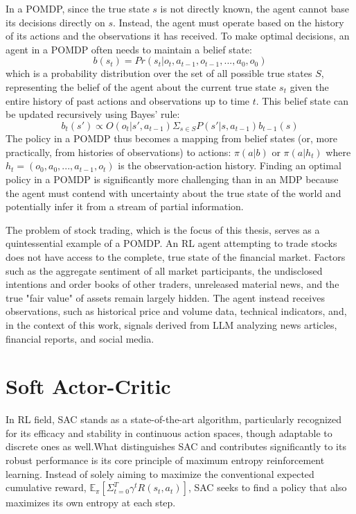 In a \gls{POMDP}, since the true state \(s\) is not directly known, the agent cannot base its decisions directly on \(s\). Instead, the agent must operate based on the history of its actions and the observations it has received. To make optimal decisions, an agent in a POMDP often needs to maintain a belief state: 
\[b(s_t) = Pr(s_t | o_t, a_{t-1}, o_{t-1}, ..., a_0, o_0)\] 
which is a probability distribution over the set of all possible true states \(S\), representing the belief of the agent about the current true state \(s_t\) given the entire history of past actions and observations up to time \(t\). This belief state can be updated recursively using Bayes' rule: 
\[b_t(s') \propto  O(o_t | s', a_{t-1}) \Sigma_{s \in S} P(s' | s, a_{t-1}) b_{t-1}(s)\] 
The policy in a \gls{POMDP} thus becomes a mapping from belief states (or, more practically, from histories of observations) to actions: \(\pi(a | b)\) or \(\pi(a | h_t)\) where \(h_t = (o_0, a_0, ..., a_{t-1}, o_t)\) is the observation-action history. Finding an optimal policy in a \gls{POMDP} is significantly more challenging than in an \gls{MDP} because the agent must contend with uncertainty about the true state of the world and potentially infer it from a stream of partial information.

The problem of stock trading, which is the focus of this thesis, serves as a quintessential example of a \gls{POMDP}. An \gls{RL} agent attempting to trade stocks does not have access to the complete, true state of the financial market. Factors such as the aggregate sentiment of all market participants, the undisclosed intentions and order books of other traders, unreleased material news, and the true "fair value" of assets remain largely hidden. The agent instead receives observations, such as historical price and volume data, technical indicators, and, in the context of this work, signals derived from \gls{LLM} analyzing news articles, financial reports, and social media. 

\section{Soft Actor-Critic}
\label{sec:sac}
In \gls{RL} field, \gls{SAC} stands as a state-of-the-art algorithm, particularly recognized for its efficacy and stability in continuous action spaces, though adaptable to discrete ones as well.What distinguishes \gls{SAC} and contributes significantly to its robust performance is its core principle of maximum entropy reinforcement learning. Instead of solely aiming to maximize the conventional expected cumulative reward, \(\mathbb{E}_\pi[\Sigma_{t=0}^T \gamma^t R(s_t, a_t)]\), \gls{SAC} seeks to find a policy that also maximizes its own entropy at each step.

